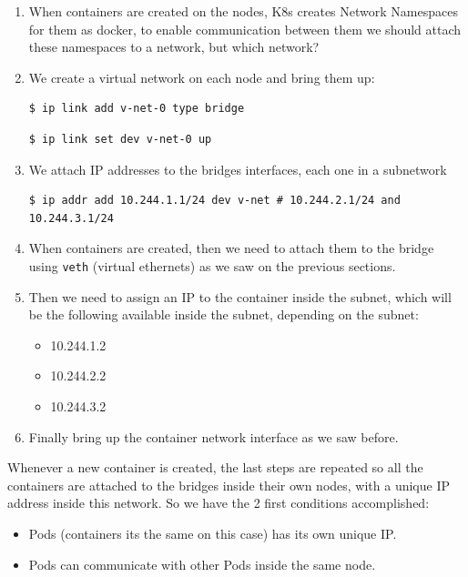 \documentclass{article}
\newenvironment{codetemplate}[1][]{%
  \mybasecolorbox[#1]
  \itshape
}{%
  \endmybasecolorbox
}
\begin{document}
\begin{enumerate}
    \item When containers are created on the nodes, K8s creates Network Namespaces for them as docker, to enable communication between them we should attach these namespaces to a network, but which network?
    \item We create a virtual network on each node and bring them up:
\begin{codetemplate}{}
\begin{verbatim}
$ ip link add v-net-0 type bridge
\end{verbatim}
\end{codetemplate}
\begin{codetemplate}{}
\begin{verbatim}
$ ip link set dev v-net-0 up
\end{verbatim}
\end{codetemplate}

    \item We attach IP addresses to the bridges interfaces, each one in a subnetwork
\begin{codetemplate}{}
\begin{verbatim}
$ ip addr add 10.244.1.1/24 dev v-net # 10.244.2.1/24 and 10.244.3.1/24
\end{verbatim}
\end{codetemplate}

    \item When containers are created, then we need to attach them to the bridge using \verb|veth| (virtual ethernets) as we saw on the previous sections.
    \item Then we need to assign an IP to the container inside the subnet, which will be the following available inside the subnet, depending on the subnet:
    \begin{itemize}
        \item 10.244.1.2
        \item 10.244.2.2
        \item 10.244.3.2
    \end{itemize}
    \item Finally bring up the container network interface as we saw before.
\end{enumerate}

Whenever a new container is created, the last steps are repeated so all the containers are attached to the bridges inside their own nodes, with a unique IP address inside this network. So we have the 2 first conditions accomplished:
\begin{itemize}
    \item Pods (containers its the same on this case) has its own unique IP.
    \item Pods can communicate with other Pods inside the same node.
\end{itemize}
\end{document}
